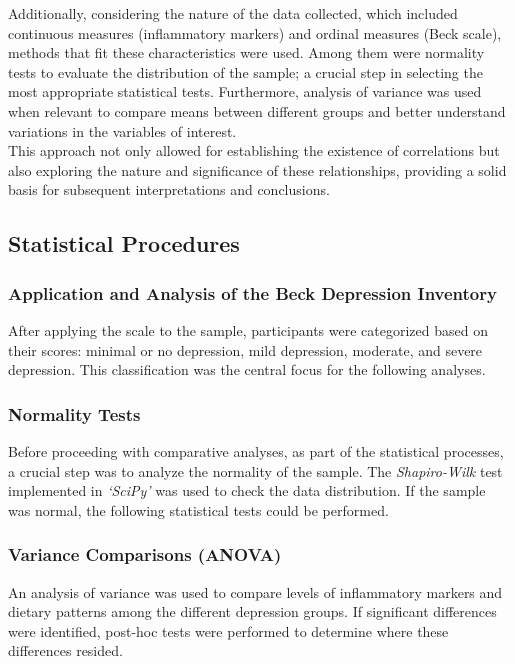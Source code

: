 \documentclass[jou]{apa7}
\begin{document}
Additionally, considering the nature of the data collected, which included continuous measures (inflammatory markers) and ordinal measures (Beck scale), methods that fit these characteristics were used. Among them were normality tests to evaluate the distribution of the sample; a crucial step in selecting the most appropriate statistical tests. Furthermore, analysis of variance was used when relevant to compare means between different groups and better understand variations in the variables of interest.\\

This approach not only allowed for establishing the existence of correlations but also exploring the nature and significance of these relationships, providing a solid basis for subsequent interpretations and conclusions.

\subsection{Statistical Procedures}\label{procedimientos-estaduxedsticos}

\subsubsection{Application and Analysis of the Beck Depression Inventory}
After applying the scale to the sample, participants were categorized based on their scores: minimal or no depression, mild depression, moderate, and severe depression. This classification was the central focus for the following analyses.\\

\subsubsection{Normality Tests}
Before proceeding with comparative analyses, as part of the statistical processes, a crucial step was to analyze the normality of the sample. The \emph{Shapiro-Wilk} test implemented in \emph{`SciPy'} was used to check the data distribution. If the sample was normal, the following statistical tests could be performed.\\

\subsubsection{Variance Comparisons (ANOVA)}
An analysis of variance was used to compare levels of inflammatory markers and dietary patterns among the different depression groups. If significant differences were identified, post-hoc tests were performed to determine where these differences resided.\\
\end{document}
